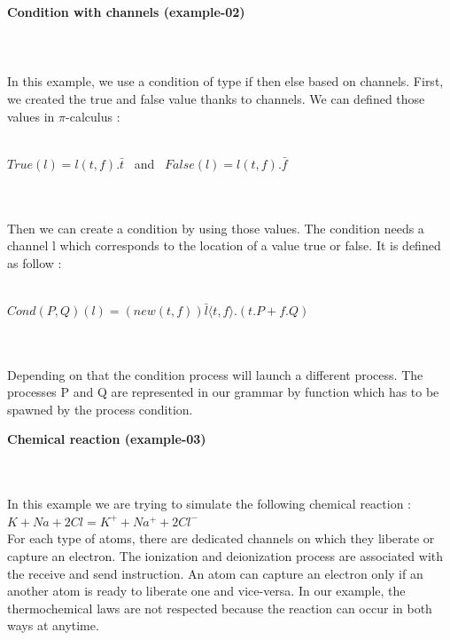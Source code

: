 \documentclass[11pt]{report}
\begin{document}
{}
\tabto{0cm} {\LARGE \textbf{Condition with channels (example-02)}} \\
\vspace*{3pt}
\\
 \\ \\
In this example, we use a condition of type if then else based on channels. First, we created the true and false value thanks to channels. We can defined those values in $\pi$-calculus : \\ \\
\centerline{$True(l) = l(t,f). \bar{t}$ \ and \ $False(l) = l(t,f). \bar{f}$} \\
\\ Then we can create a condition by using those values.
The condition needs a channel l which corresponds to the location of a value true or false. It is defined as follow : \\ \\
\centerline{$ Cond(P,Q)(l) = (new (t,f)) \bar{l} \langle t,f \rangle .(t.P + f.Q)$} \\
\\Depending on that the condition process will launch a different process. The processes P and Q are represented in our grammar by function which has to be spawned by the process condition. 

{}
\tabto{0cm} {\LARGE \textbf{Chemical reaction (example-03)}}
\vspace*{3pt}
\vspace*{10pt}

 \\ \\
In this example we are trying to simulate the following chemical reaction : \\
$K + Na + 2Cl = K^+ + Na^+ + 2Cl^-$ \\
For each type of atoms, there are dedicated channels on which they liberate or capture an electron. The ionization and deionization process are associated with the receive and send instruction. An atom can capture an electron only if an another atom is ready to liberate one and vice-versa. In our example, the thermochemical laws are not respected because the reaction can occur in both ways at anytime.  
\end{document}
